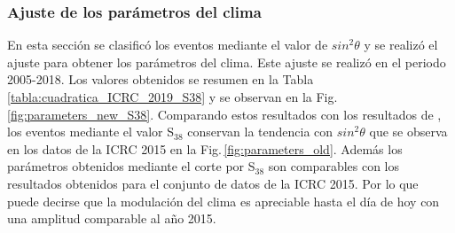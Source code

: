     \subsubsection{Ajuste de los parámetros del clima}

    En esta sección se clasificó los eventos mediante el valor de $sin^2\theta$ y se realizó el ajuste para obtener los parámetros del clima. Este ajuste se realizó en el periodo 2005-2018. Los valores obtenidos se resumen en la Tabla\,\ref{tabla:cuadratica_ICRC_2019_S38} y se  observan en la Fig.\,\ref{fig:parameters_new_S38}. Comparando estos resultados con los resultados de \cite{aab2017impact}, los eventos mediante el valor S$_{38}$  conservan la tendencia con $sin^2\theta$ que se observa en los datos de la ICRC 2015 en la Fig.\,\ref{fig:parameters_old}. Además los parámetros obtenidos mediante el corte por S$_{38}$ son comparables con los resultados obtenidos para el conjunto de datos de la ICRC 2015. Por lo que puede decirse que la modulación del clima es apreciable  hasta el día de hoy con una amplitud comparable al año 2015.

